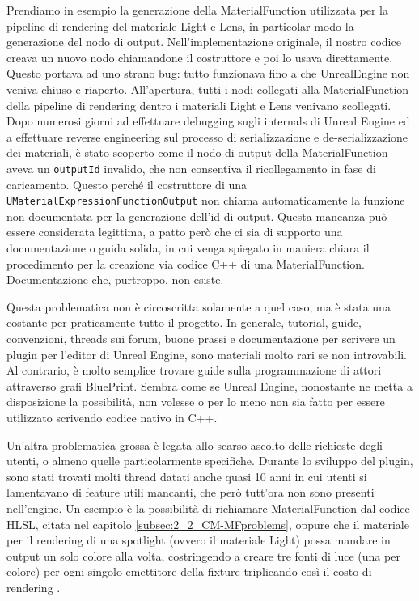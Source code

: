 \documentclass[main.tex]{subfiles}
\begin{document}
Prendiamo in esempio la generazione della MaterialFunction utilizzata per la pipeline di rendering del materiale Light e Lens, in particolar modo la generazione del nodo di output. Nell'implementazione originale, il nostro codice creava un nuovo nodo chiamandone il costruttore e poi lo usava direttamente. Questo portava ad uno strano bug: tutto funzionava fino a che UnrealEngine non veniva chiuso e riaperto. All'apertura, tutti i nodi collegati alla MaterialFunction della pipeline di rendering dentro i materiali Light e Lens venivano scollegati. Dopo numerosi giorni ad effettuare debugging sugli internals di Unreal Engine ed a effettuare reverse engineering sul processo di serializzazione e de-serializzazione dei materiali, è stato scoperto come il nodo di output della MaterialFunction aveva un \lstinline{outputId} invalido, che non consentiva il ricollegamento in fase di caricamento. Questo perché il costruttore di una \lstinline{UMaterialExpressionFunctionOutput} non chiama automaticamente la funzione non documentata per la generazione dell'id di output. Questa mancanza può essere considerata legittima, a patto però che ci sia di supporto una documentazione o guida solida, in cui venga spiegato in maniera chiara il procedimento per la creazione via codice C++ di una MaterialFunction. Documentazione che, purtroppo, non esiste.

Questa problematica non è circoscritta solamente a quel caso, ma è stata una costante per praticamente tutto il progetto. In generale, tutorial, guide, convenzioni, threads sui forum, buone prassi e documentazione per scrivere un plugin per l'editor di Unreal Engine, sono materiali molto rari se non introvabili. Al contrario, è molto semplice trovare guide sulla programmazione di attori attraverso grafi BluePrint. Sembra come se Unreal Engine, nonostante ne metta a disposizione la possibilità, non volesse o per lo meno non sia fatto per essere utilizzato scrivendo codice nativo in C++.
\newline

Un'altra problematica grossa è legata allo scarso ascolto delle richieste degli utenti, o almeno quelle particolarmente specifiche. Durante lo sviluppo del plugin, sono stati trovati molti thread datati anche quasi 10 anni in cui utenti si lamentavano di feature utili mancanti, che però tutt'ora non sono presenti nell'engine. Un esempio è la possibilità di richiamare MaterialFunction dal codice HLSL, citata nel capitolo \ref{subsec:2_2_CM-MFproblems}, oppure che il materiale per il rendering di una spotlight (ovvero il materiale Light) possa mandare in output un solo colore alla volta, costringendo a creare tre fonti di luce (una per colore) per ogni singolo emettitore della fixture triplicando così il costo di rendering \cite{rgbSpotlight}.\newline
\end{document}
